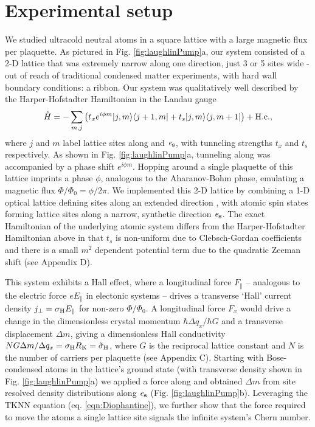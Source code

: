 \section{Experimental setup}
	
	We studied ultracold neutral atoms in a square lattice with a large magnetic flux per plaquette. As pictured in  Fig. \ref{fig:laughlinPump}a, our system consisted of a 2-D lattice that was extremely narrow along one direction, just 3 or 5 sites wide - out of reach of traditional condensed matter experiments, with hard wall boundary conditions: a ribbon. Our system was qualitatively well described by the Harper-Hofstadter Hamiltonian in the Landau gauge\cite{Harper1955,Hofstadter1976}
\begin{equation}
\hat{H}= -\sum\limits_{m,j}\left({t_x e^{i\phi m}|j,m\rangle\langle j+1,m|+t_s|j,m\rangle\langle j,m+1|}\right) + \rm{H.c.},
\label{eqn:Hamiltonian}
\end{equation}
where $j$ and $m$ label lattice sites along \ex    and $\bf{\mathit{e}_s}$, with tunneling strengths $t_x$ and $t_s$ respectively. As shown in Fig. \ref{fig:laughlinPump}a, tunneling along \ex    was accompanied by a phase shift $e^{i\phi m}$. Hopping around a single plaquette of this lattice imprints a phase $\phi$, analogous to the Aharanov-Bohm phase, emulating a magnetic flux $\Phi/\Phi_0=\phi/2\pi$. We implemented this 2-D lattice by combining a 1-D optical lattice defining sites along an extended direction \ex, with atomic spin states forming lattice sites along a narrow, synthetic\cite{Celi2014,Stuhl2015,Mancini2015,Meier2016} direction $\bf{\mathit{e}_s}$. The exact Hamiltonian of the underlying atomic system differs from the Harper-Hofstadter Hamiltonian above in that $t_s$ is non-uniform due to Clebsch-Gordan coefficients and there is a small $m^2$ dependent potential term due to the quadratic Zeeman shift (see Appendix D). 

	This system exhibits a Hall effect, where a longitudinal force $F_{\parallel}$ -- analogous to the electric force $e E_{\parallel}$ in electonic systems -- drives a transverse `Hall' current density $j_{\perp} = \sigma_{\rm{H}} E_{\parallel}$ for non-zero $\Phi/\Phi_0$. A longitudinal force $F_x$ would drive a change in the dimensionless crystal momentum $\hbar\Delta q_x/\hbar G$  and a transverse displacement $\Delta m$, giving a dimensionless Hall conductivity  $N G\Delta m/ \Delta q_x=\sigma_{\rm{H}} R_{\rm{K}}={\tilde\sigma}_{\rm{H}}$, where $G$ is the reciprocal lattice constant and $N$ is the number of carriers per plaquette (see Appendix C).  Starting with Bose-condensed atoms in the lattice's ground state (with transverse density shown in Fig. \ref{fig:laughlinPump}a) we applied a force along \ex and obtained $\Delta m$ from site resolved density distributions\cite{Wang2013} along $\bf{\mathit{e}_s}$ (Fig. \ref{fig:laughlinPump}b). Leveraging the TKNN equation (eq. \ref{eqn:Diophantine}), we further show that the force required to move the atoms a single lattice site signals the infinite system's Chern number. 
	

